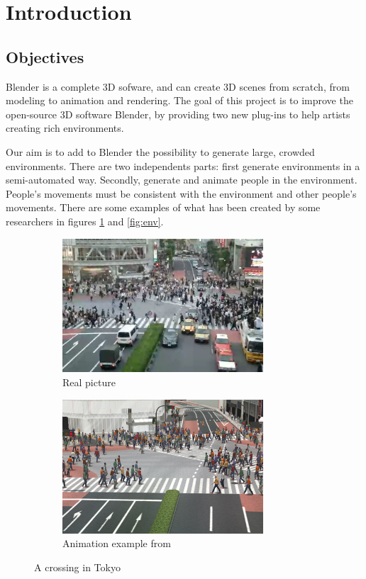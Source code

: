 \section{Introduction}

\subsection{Objectives}

Blender is a complete 3D sofware, and can create 3D scenes from
scratch, from modeling to animation and rendering. The goal of this
project is to improve the open-source 3D software Blender, by
providing two new plug-ins to help artists creating rich environments.

Our aim is to add to Blender the possibility to generate large,
crowded environments. There are two independents parts: first
generate environments in a semi-automated way. Secondly, generate and
animate people in the environment. People's movements must be consistent
with the environment and other people's movements. There are some
examples of what has been created by some researchers in figures
\ref{fig:crowd} and \ref{fig:env}.

\begin{figure}[h] \centering

  \begin{subfigure}[t]{0.5\textwidth}
    \includegraphics[width=7.5cm]{img/PLE_real.png}
    \caption{Real picture}
  \end{subfigure}%
  \begin{subfigure}[t]{0.5\textwidth}
    \includegraphics[width=7.5cm]{img/PLE_simu.png}
    \caption{Animation example from \cite{PLE}}
  \end{subfigure}
  \caption{A crossing in Tokyo}
  \label{fig:crowd}
\end{figure}

